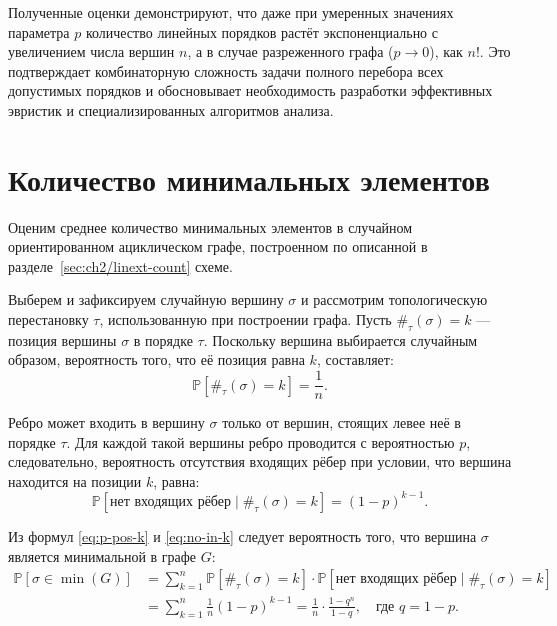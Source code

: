 Полученные оценки демонстрируют, что даже при умеренных значениях
параметра $p$ количество линейных порядков растёт экспоненциально с
увеличением числа вершин $n$, а в случае разреженного графа ($p \to
0$), как $n!$. Это подтверждает комбинаторную сложность задачи
полного перебора всех допустимых порядков и обосновывает
необходимость разработки эффективных эвристик и специализированных
алгоритмов анализа.
\section{Количество минимальных элементов}
\label{sec:ch2/min-elems}

Оценим среднее количество минимальных элементов в случайном
ориентированном ациклическом графе, построенном по описанной в
разделе~\ref{sec:ch2/linext-count} схеме.

Выберем и зафиксируем случайную вершину $\sigma$ и рассмотрим
топологическую перестановку $\tau$, использованную при построении
графа. Пусть $\#_{\tau}(\sigma) = k$ — позиция вершины $\sigma$ в
порядке $\tau$. Поскольку вершина выбирается случайным образом,
вероятность того, что её позиция равна $k$, составляет:
\begin{equation}
  \label{eq:p-pos-k}
  \mathbb{P}[\#_{\tau}(\sigma) = k] = \frac{1}{n}.
\end{equation}

Ребро может входить в вершину $\sigma$ только от вершин, стоящих
левее неё в порядке $\tau$. Для каждой такой вершины ребро проводится
с вероятностью $p$, следовательно, вероятность отсутствия входящих
рёбер при условии, что вершина находится на позиции $k$, равна:
\begin{equation}
  \label{eq:no-in-k}
  \mathbb{P}[\text{нет входящих рёбер} \mid \#_{\tau}(\sigma) = k] =
  (1-p)^{k-1}.
\end{equation}

Из формул \eqref{eq:p-pos-k} и \eqref{eq:no-in-k} следует вероятность
того, что вершина $\sigma$ является минимальной в графе $G$:
\begin{equation}
  \label{eq:n-is-min}
  \begin{aligned}
    \mathbb{P}[\sigma \in \min(G)] &=
    \sum_{k=1}^{n}{\mathbb{P}[\#_{\tau}(\sigma) = k] \cdot
    \mathbb{P}[\text{нет входящих рёбер} \mid \#_{\tau}(\sigma) = k]} \\
    &= \sum_{k=1}^{n}{\frac{1}{n}(1-p)^{k-1}} =
    \frac{1}{n} \cdot \frac{1-q^n}{1-q}, \quad \text{где } q = 1-p.
  \end{aligned}
\end{equation}


